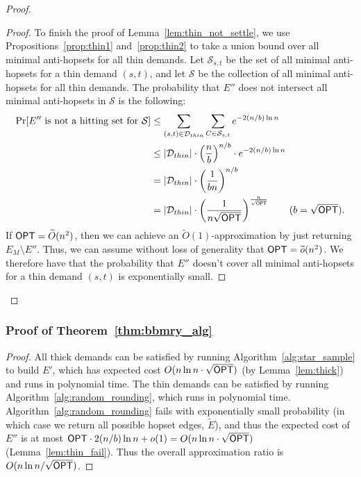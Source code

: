 \begin{proof}
\begin{proof}
    To finish the proof of Lemma~\ref{lem:thin_not_settle}, we use Propositions~\ref{prop:thin1} and~\ref{prop:thin2} to take a union bound over all minimal anti-hopsets for all thin demands. Let $\mathcal{S}_{s,t}$ be the set of all minimal anti-hopsets for a thin demand $(s,t)$, and let $\mathcal{S}$ be the collection of all minimal anti-hopsets for all thin demands. The probability that $E''$ does not intersect all minimal anti-hopsets in $\mathcal{S}$ is the following:
    \begin{align*}
        \Pr[E'' \text{ is not a hitting set for } \mathcal{S}] &\leq  \sum_{(s,t) \in \mathcal{D}_{thin}} \sum_{C \in \mathcal{S}_{s,t}} e^{-2 (n/b) \ln{n}} \\
        &\leq  |\mathcal{D}_{thin}| \cdot \left( \frac{n}{b} \right)^{n/b} \cdot e^{-2 (n/b) \ln{n}} \\
        &= |\mathcal{D}_{thin}| \cdot \left( \frac{1}{b n} \right)^{n/b} \\
        &= |\mathcal{D}_{thin}| \cdot \left( \frac{1}{n \sqrt{{\opt}}} \right)^{\frac{n}{\sqrt{{\opt}}}} \tag{$b = \sqrt{{\opt}}$}.
    \end{align*}
    If ${{\sf OPT}} = \widetilde{O}(n^{2})$, then we can achieve an $\widetilde{O}(1)$-approximation by just returning $E_M \setminus E''$. Thus, we can assume without loss of generality that ${{\sf OPT}} = \widetilde{o}(n^{2})$.  We therefore have that the probability that $E''$ doesn't cover all minimal anti-hopsets for a thin demand $(s,t)$ is exponentially small.
    \end{proof}

\end{proof}
\else
\fi


\subsubsection{Proof of Theorem~\ref{thm:bbmry_alg}}
\begin{proof}
    All thick demands can be satisfied by running Algorithm~\ref{alg:star_sample} to build $E'$, which has expected cost $O(n \ln{n} \cdot \sqrt{{{\sf OPT}}})$ (by Lemma~\ref{lem:thick}) and runs in polynomial time. The thin demands can be satisfied by running Algorithm~\ref{alg:random_rounding}, which runs in polynomial time. Algorithm~\ref{alg:random_rounding} fails with exponentially small probability (in which case we return all possible hopset edges, $\widetilde{E}$), and thus the expected cost of $E''$ is at most ${{\sf OPT}} \cdot  2(n/b) \ln{n} + o(1) = O(n \ln{n} \cdot \sqrt{{{\sf OPT}}} )$ (Lemma~\ref{lem:thin_fail}). Thus the overall approximation ratio is $O( n \ln{n} / \sqrt{{{\sf OPT}}})$. 
\end{proof}





